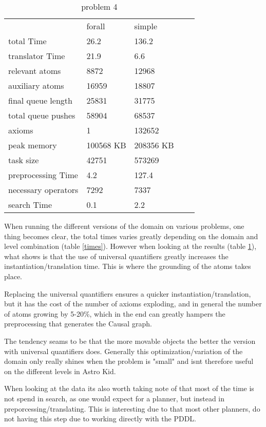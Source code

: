 			\begin{table}[h]
				\centering
				\caption{problem 4}
				\label{prob4}
				\begin{tabular}{lllll}
					& forall & simple  \\
					total Time & 26.2 & 136.2 \\
					translator Time& 21.9 & 6.6 \\
					
					
					relevant atoms & 8872 & 12968\\
					auxiliary atoms & 16959& 18807\\
					final queue length &25831 & 31775\\
					total queue pushes &58904 & 68537\\
					axioms & 1 & 132652 \\ 
					peak memory & 100568 KB & 208356 KB\\ 
					task size & 42751 & 573269\\
					
					
					preprocessing Time& 4.2 & 127.4 \\
					necessary operators & 7292 & 7337\\
					
					
					search Time & 0.1 & 2.2 \\
				\end{tabular}
			\end{table}
			When running the different versions of the domain on various problems, one thing becomes clear, the total times varies greatly depending on the domain and level combination (table \ref{times}). However when looking at the results (table \ref{prob4}), what shows is that the use of universal quantifiers greatly increases the instantiation/translation time. This is where the grounding of the atoms takes place.
			
			Replacing the universal quantifiers ensures a quicker instantiation/translation, but it has the cost of the number of axioms exploding, and in general the number of atoms growing by 5-20\%, which in the end can greatly hampers the preprocessing that generates the Causal graph.
			
			The tendency seams to be that the more movable objects the better the version with universal quantifiers does. Generally this optimization/variation of the domain only really shines when the problem is "small" and isnt therefore useful on the different levels in Astro Kid.
			
			
			When looking at the data its also worth taking note of that most of the time is not spend in search, as one would expect for a planner, but instead in preporcessing/translating. This is interesting due to that most other planners, do not having this step due to working directly with the PDDL. 
			
